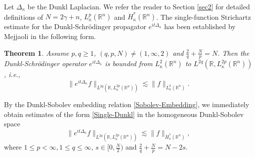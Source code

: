 \documentclass[a4paper,11pt, reqno]{amsart}
\numberwithin{equation}{section}
\theoremstyle{plain}
\newtheorem{theorem}{Theorem}[section]
\theoremstyle{definition}
\theoremstyle{remark}
\begin{document}
Let $\Delta_\kappa$ be the Dunkl Laplacian. We refer the reader 
 to  Section \ref{sec2} for detailed definitions of  $N=2\gamma+n$, $L_\kappa^p(\mathbb{R}^n)$ and $\dot{H}_\kappa^s(\mathbb{R}^n)$. The single-function Strichartz estimate for the Dunkl-Schr\"{o}dinger propagator $e^{it\Delta_\kappa}$ has been established by Mejjaoli  \cite{Mejjaoli2009} in the following form.
\begin{theorem}\label{Strichartz-single}
Assume $p,q\geq1$, $(q,p,N)\neq (1,\infty,2)$ and $\frac{2}{q}+\frac{N}{p}=N$. Then the Dunkl-Schr\"{o}dinger operator $e^{it\Delta_\kappa}$ is bounded from $L_\kappa^2(\mathbb{R}^n)$ to $L^{2q}(\mathbb{R}, L_\kappa^{2p}(\mathbb{R}^n))$, i.e.,
\begin{equation}\label{Single-Dunkl}
\|e^{it\Delta_\kappa}f\|_{L^{2q}(\mathbb{R},L_\kappa^{2p}(\mathbb{R}^n))}\lesssim \|f\|_{L_\kappa^2(\mathbb{R}^n)}.
\end{equation}
\end{theorem}
By the Dunkl-Sobolev embedding relation \eqref{Sobolev-Embedding}, we immediately obtain estimates of the form \eqref{Single-Dunkl} in the homogeneous Dunkl-Sobolev space
\begin{equation}\label{Sobolev-single}
\|e^{it\Delta_\kappa}f\|_{L^{2q}(\mathbb{R},L_\kappa^{2p}(\mathbb{R}^n))}\lesssim \|f\|_{\dot{H}_\kappa^s(\mathbb{R}^n)},
\end{equation}
where $1\leq p<\infty,1\leq q\leq \infty$, $s\in [0,\frac{N}{2})$ and $\frac{2}{q}+\frac{N}{p}=N-2s$.
\end{document}
